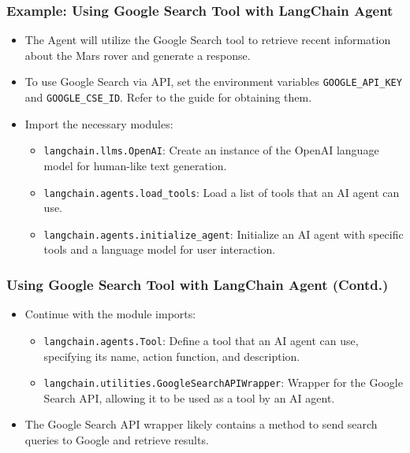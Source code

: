 \begin{frame}[fragile]
\frametitle{Example: Using Google Search Tool with LangChain Agent}

\begin{itemize}
    \item The Agent will utilize the Google Search tool to retrieve recent information about the Mars rover and generate a response.
    \item To use Google Search via API, set the environment variables \texttt{GOOGLE\_API\_KEY} and \texttt{GOOGLE\_CSE\_ID}. Refer to the guide for obtaining them.
    \item Import the necessary modules:
    \begin{itemize}
        \item \texttt{langchain.llms.OpenAI}: Create an instance of the OpenAI language model for human-like text generation.
        \item \texttt{langchain.agents.load\_tools}: Load a list of tools that an AI agent can use.
        \item \texttt{langchain.agents.initialize\_agent}: Initialize an AI agent with specific tools and a language model for user interaction.
    \end{itemize}
\end{itemize}

\end{frame}

\begin{frame}[fragile]
\frametitle{Using Google Search Tool with LangChain Agent (Contd.)}

\begin{itemize}
    \item Continue with the module imports:
    \begin{itemize}
        \item \texttt{langchain.agents.Tool}: Define a tool that an AI agent can use, specifying its name, action function, and description.
        \item \texttt{langchain.utilities.GoogleSearchAPIWrapper}: Wrapper for the Google Search API, allowing it to be used as a tool by an AI agent.
    \end{itemize}
    \item The Google Search API wrapper likely contains a method to send search queries to Google and retrieve results.
\end{itemize}

\end{frame}

